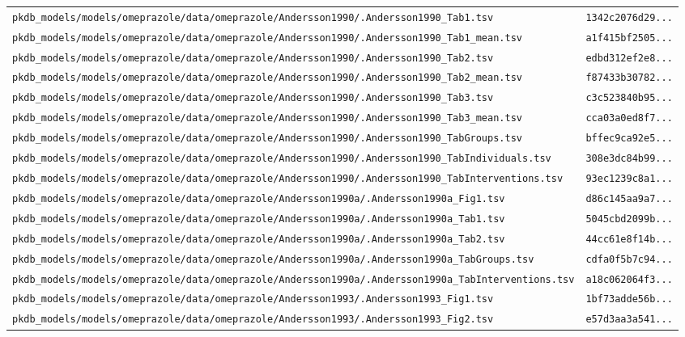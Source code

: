 \begin{longtable}{ll}
\texttt{pkdb\_models/models/omeprazole/data/omeprazole/Andersson1990/.Andersson1990\_Tab1.tsv} & \texttt{1342c2076d29...} \\
\texttt{pkdb\_models/models/omeprazole/data/omeprazole/Andersson1990/.Andersson1990\_Tab1\_mean.tsv} & \texttt{a1f415bf2505...} \\
\texttt{pkdb\_models/models/omeprazole/data/omeprazole/Andersson1990/.Andersson1990\_Tab2.tsv} & \texttt{edbd312ef2e8...} \\
\texttt{pkdb\_models/models/omeprazole/data/omeprazole/Andersson1990/.Andersson1990\_Tab2\_mean.tsv} & \texttt{f87433b30782...} \\
\texttt{pkdb\_models/models/omeprazole/data/omeprazole/Andersson1990/.Andersson1990\_Tab3.tsv} & \texttt{c3c523840b95...} \\
\texttt{pkdb\_models/models/omeprazole/data/omeprazole/Andersson1990/.Andersson1990\_Tab3\_mean.tsv} & \texttt{cca03a0ed8f7...} \\
\texttt{pkdb\_models/models/omeprazole/data/omeprazole/Andersson1990/.Andersson1990\_TabGroups.tsv} & \texttt{bffec9ca92e5...} \\
\texttt{pkdb\_models/models/omeprazole/data/omeprazole/Andersson1990/.Andersson1990\_TabIndividuals.tsv} & \texttt{308e3dc84b99...} \\
\texttt{pkdb\_models/models/omeprazole/data/omeprazole/Andersson1990/.Andersson1990\_TabInterventions.tsv} & \texttt{93ec1239c8a1...} \\
\texttt{pkdb\_models/models/omeprazole/data/omeprazole/Andersson1990a/.Andersson1990a\_Fig1.tsv} & \texttt{d86c145aa9a7...} \\
\texttt{pkdb\_models/models/omeprazole/data/omeprazole/Andersson1990a/.Andersson1990a\_Tab1.tsv} & \texttt{5045cbd2099b...} \\
\texttt{pkdb\_models/models/omeprazole/data/omeprazole/Andersson1990a/.Andersson1990a\_Tab2.tsv} & \texttt{44cc61e8f14b...} \\
\texttt{pkdb\_models/models/omeprazole/data/omeprazole/Andersson1990a/.Andersson1990a\_TabGroups.tsv} & \texttt{cdfa0f5b7c94...} \\
\texttt{pkdb\_models/models/omeprazole/data/omeprazole/Andersson1990a/.Andersson1990a\_TabInterventions.tsv} & \texttt{a18c062064f3...} \\
\texttt{pkdb\_models/models/omeprazole/data/omeprazole/Andersson1993/.Andersson1993\_Fig1.tsv} & \texttt{1bf73adde56b...} \\
\texttt{pkdb\_models/models/omeprazole/data/omeprazole/Andersson1993/.Andersson1993\_Fig2.tsv} & \texttt{e57d3aa3a541...} \\

\end{longtable}
